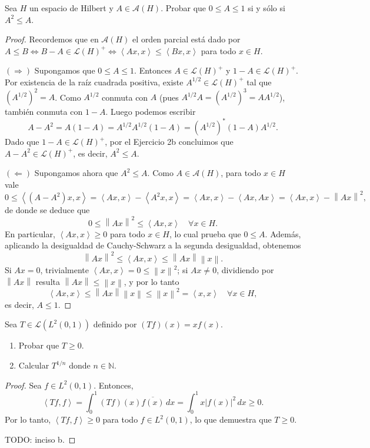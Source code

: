 \documentclass{article}
\theoremstyle{definition}
\newcommand{\N}{\mathbb{N}}
\newcommand{\norm}[1]{\left\lVert #1 \right\rVert}       %
\newcommand{\ip}[2]{\left\langle #1, #2 \right\rangle}   %
\newcommand{\LH}{\mathcal{L}(H)}                         %
\newcommand{\AH}{\mathcal{A}(H)}                         %
\newenvironment{ejercicio}[1]{\begin{trivlist}
\item[\hskip \labelsep {\bfseries Ejercicio}\hskip \labelsep {\bfseries #1.}]}{\end{trivlist}}
\begin{document}
\begin{ejercicio}{7}
	Sea \( H \) un espacio de Hilbert y \( A \in \AH \). Probar que \( 0 \le A \le 1 \) si y sólo si \( A^2 \le A \).
\end{ejercicio}
\begin{proof}
	Recordemos que en \( \AH \) el orden parcial está dado por \( A \le B \iff B - A \in \LH^+ \iff \ip{Ax}{x} \le \ip{Bx}{x} \) para todo \( x \in H \).

	\( (\Rightarrow) \) Supongamos que \( 0 \le A \le 1 \). Entonces \( A \in \LH^+ \) y \( 1 - A \in \LH^+ \). Por existencia de la raíz cuadrada positiva, existe \( A^{1/2} \in \LH^+ \) tal que \( {(A^{1/2})}^2 = A \). Como \( A^{1/2} \) conmuta con \( A \) (pues \( A^{1/2}A = {(A^{1/2})}^3 = A A^{1/2} \)), también conmuta con \( 1 - A \). Luego podemos escribir
	\[
		A - A^2 = A(1 - A) = A^{1/2} A^{1/2}(1 - A) = {(A^{1/2})}^* (1 - A) A^{1/2}.
	\]
	Dado que \( 1 - A \in \LH^+ \), por el Ejercicio 2b concluimos que \( A - A^2 \in \LH^+ \), es decir, \( A^2 \le A \).

	\( (\Leftarrow) \) Supongamos ahora que \( A^2 \le A \). Como \( A \in \AH \), para todo \( x \in H \) vale
	\[
		0 \le \ip{(A - A^2)x}{x} = \ip{Ax}{x} - \ip{A^2 x}{x} = \ip{Ax}{x} - \ip{Ax}{Ax} = \ip{Ax}{x} - \norm{Ax}^2,
	\]
	de donde se deduce que
	\[
		0 \le \norm{Ax}^2 \le \ip{Ax}{x} \quad \forall x \in H.
	\]
	En particular, \( \ip{Ax}{x} \ge 0 \) para todo \( x \in H \), lo cual prueba que \( 0 \le A \). Además, aplicando la desigualdad de Cauchy-Schwarz a la segunda desigualdad, obtenemos
	\[
		\norm{Ax}^2 \le \ip{Ax}{x} \le \norm{Ax}\norm{x}.
	\]
	Si \( Ax = 0 \), trivialmente \( \ip{Ax}{x} = 0 \le \norm{x}^2 \); si \( Ax \neq 0 \), dividiendo por \( \norm{Ax} \) resulta \( \norm{Ax} \le \norm{x} \), y por lo tanto
	\[
		\ip{Ax}{x} \le \norm{Ax}\norm{x} \le \norm{x}^2 = \ip{x}{x} \quad \forall x \in H,
	\]
	es decir, \( A \le 1 \).
\end{proof}

\vspace{0.5cm}

\begin{ejercicio}{8}
	Sea \( T \in \mathcal{L}(L^2(0,1)) \) definido por \( (Tf)(x) = xf(x) \).
	\begin{enumerate}
		\item Probar que \( T \ge 0 \).
		\item Calcular \( T^{1/n} \) donde \( n \in \N \).
	\end{enumerate}
\end{ejercicio}
\begin{proof}
	Sea \( f \in L^2(0, 1) \). Entonces, \[
		\ip{Tf}{f} = \int_0^1 (Tf)(x) \overline{f(x)} \, dx = \int_0^1 x |f(x)|^2 \, dx \ge 0.
	\]
	Por lo tanto, \( \ip{Tf}{f} \ge 0 \) para todo \( f \in L^2(0, 1) \), lo que demuestra que \( T \ge 0 \).

	TODO: inciso b.
\end{proof}
\end{document}
